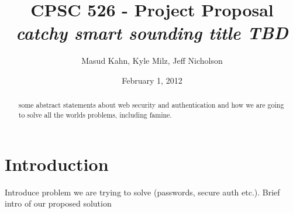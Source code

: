 \documentclass[11pt]{article}   %
\begin{document}
\title{\bf CPSC 526 - Project Proposal \\ \emph{catchy smart sounding title TBD}}   %
\author{Masud Kahn, Kyle Milz, Jeff Nicholson}         %
\date{February 1, 2012}    %
\maketitle

\tableofcontents
\pagebreak
\begin{abstract}
some abstract statements about web security and authentication and how we are going to solve all the worlds problems, including famine.
\end{abstract}
\pagebreak
\section{Introduction}
Introduce problem we are trying to solve (passwords, secure auth etc.). Brief intro of our proposed solution
\end{document}
